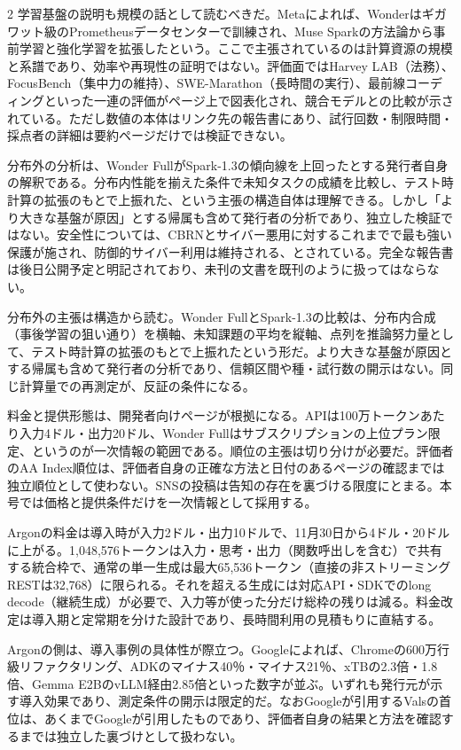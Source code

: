 \documentclass[lualatex,a4paper,10pt]{jlreq}
\begin{document}
\begin{multicols}{2}
学習基盤の説明も規模の話として読むべきだ。Metaによれば、Wonderはギガワット級のPrometheusデータセンターで訓練され、Muse Sparkの方法論から事前学習と強化学習を拡張したという。ここで主張されているのは計算資源の規模と系譜であり、効率や再現性の証明ではない。評価面ではHarvey LAB（法務）、FocusBench（集中力の維持）、SWE-Marathon（長時間の実行）、最前線コーディングといった一連の評価がページ上で図表化され、競合モデルとの比較が示されている。ただし数値の本体はリンク先の報告書にあり、試行回数・制限時間・採点者の詳細は要約ページだけでは検証できない。
\cite{B01,B62,B63,B02,B64,B03}


分布外の分析は、Wonder FullがSpark-1.3の傾向線を上回ったとする発行者自身の解釈である。分布内性能を揃えた条件で未知タスクの成績を比較し、テスト時計算の拡張のもとで上振れた、という主張の構造自体は理解できる。しかし「より大きな基盤が原因」とする帰属も含めて発行者の分析であり、独立した検証ではない。安全性については、CBRNとサイバー悪用に対するこれまでで最も強い保護が施され、防御的サイバー利用は維持される、とされている。完全な報告書は後日公開予定と明記されており、未刊の文書を既刊のように扱ってはならない。
\cite{B01,B62,B63,B02,B64,B03}


分布外の主張は構造から読む。Wonder FullとSpark-1.3の比較は、分布内合成（事後学習の狙い通り）を横軸、未知課題の平均を縦軸、点列を推論努力量として、テスト時計算の拡張のもとで上振れたという形だ。より大きな基盤が原因とする帰属も含めて発行者の分析であり、信頼区間や種・試行数の開示はない。同じ計算量での再測定が、反証の条件になる。
\cite{B01,B62,B63,B02,B64,B03}


料金と提供形態は、開発者向けページが根拠になる。APIは100万トークンあたり入力4ドル・出力20ドル、Wonder Fullはサブスクリプションの上位プラン限定、というのが一次情報の範囲である。順位の主張は切り分けが必要だ。評価者のAA Index順位は、評価者自身の正確な方法と日付のあるページの確認までは独立順位として使わない。SNSの投稿は告知の存在を裏づける限度にとまる。本号では価格と提供条件だけを一次情報として採用する。
\cite{B01,B62,B63,B02,B64,B03}


Argonの料金は導入時が入力2ドル・出力10ドルで、11月30日から4ドル・20ドルに上がる。1,048,576トークンは入力・思考・出力（関数呼出しを含む）で共有する統合枠で、通常の単一生成は最大65,536トークン（直接の非ストリーミングRESTは32,768）に限られる。それを超える生成には対応API・SDKでのlong decode（継続生成）が必要で、入力等が使った分だけ総枠の残りは減る。料金改定は導入期と定常期を分けた設計であり、長時間利用の見積もりに直結する。
\cite{B05,B65,B08,B04,B07,B06}


Argonの側は、導入事例の具体性が際立つ。Googleによれば、Chromeの600万行級リファクタリング、ADKのマイナス40％・マイナス21％、xTBの2.3倍・1.8倍、Gemma E2BのvLLM経由2.85倍といった数字が並ぶ。いずれも発行元が示す導入効果であり、測定条件の開示は限定的だ。なおGoogleが引用するValsの首位は、あくまでGoogleが引用したものであり、評価者自身の結果と方法を確認するまでは独立した裏づけとして扱わない。
\cite{B05,B65,B08,B04,B07,B06}



\end{multicols}
\end{document}

